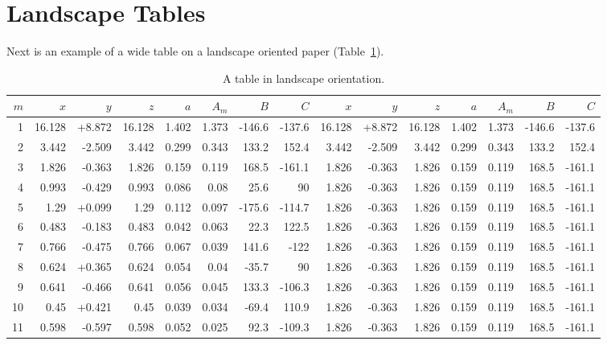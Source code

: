 \blindtext

\section{Landscape Tables}
Next is an example of a wide table on a landscape oriented paper (Table~\ref{tab:land}).

\begin{landscape}
	\pagestyle{empty} %
	\begin{table}[h]
		\caption[A landscape table]{A table in landscape orientation.} 
		\begin{tabular}{rrrrrrrrrrrrrrr} \toprule
			\label{tab:land} 		
			{$m$} & {$x$} & {$y$} & {$z$} & {$a$} & {$A_m$} & {$B$} & {$C$} & {$x$} & {$y$} & {$z$} & {$a$} & {$A_m$} & {$B$} & {$C$} \\ \midrule
			1  & 16.128 & +8.872 & 16.128 & 1.402 & 1.373 & -146.6 & -137.6 & 16.128 & +8.872 & 16.128 & 1.402 & 1.373 & -146.6 & -137.6\\
			2  & 3.442  & -2.509 & 3.442  & 0.299 & 0.343 & 133.2  & 152.4 & 3.442  & -2.509 & 3.442  & 0.299 & 0.343 & 133.2  & 152.4 \\
			3  & 1.826  & -0.363 & 1.826  & 0.159 & 0.119 & 168.5  & -161.1 & 1.826  & -0.363 & 1.826  & 0.159 & 0.119 & 168.5  & -161.1 \\
			4  & 0.993  & -0.429 & 0.993  & 0.086 & 0.08  & 25.6   & 90 & 1.826  & -0.363 & 1.826  & 0.159 & 0.119 & 168.5  & -161.1    \\ \midrule
			5  & 1.29   & +0.099 & 1.29   & 0.112 & 0.097 & -175.6 & -114.7 & 1.826  & -0.363 & 1.826  & 0.159 & 0.119 & 168.5  & -161.1\\
			6  & 0.483  & -0.183 & 0.483  & 0.042 & 0.063 & 22.3   & 122.5 & 1.826  & -0.363 & 1.826  & 0.159 & 0.119 & 168.5  & -161.1 \\
			7  & 0.766  & -0.475 & 0.766  & 0.067 & 0.039 & 141.6  & -122 & 1.826  & -0.363 & 1.826  & 0.159 & 0.119 & 168.5  & -161.1  \\
			8  & 0.624  & +0.365 & 0.624  & 0.054 & 0.04  & -35.7  & 90  & 1.826  & -0.363 & 1.826  & 0.159 & 0.119 & 168.5  & -161.1   \\ \midrule
			9  & 0.641  & -0.466 & 0.641  & 0.056 & 0.045 & 133.3  & -106.3 & 1.826  & -0.363 & 1.826  & 0.159 & 0.119 & 168.5  & -161.1\\
			10 & 0.45   & +0.421 & 0.45   & 0.039 & 0.034 & -69.4  & 110.9  & 1.826  & -0.363 & 1.826  & 0.159 & 0.119 & 168.5  & -161.1\\
			11 & 0.598  & -0.597 & 0.598  & 0.052 & 0.025 & 92.3   & -109.3 & 1.826  & -0.363 & 1.826  & 0.159 & 0.119 & 168.5  & -161.1\\ \bottomrule
		\end{tabular}
	\end{table}
\end{landscape}

